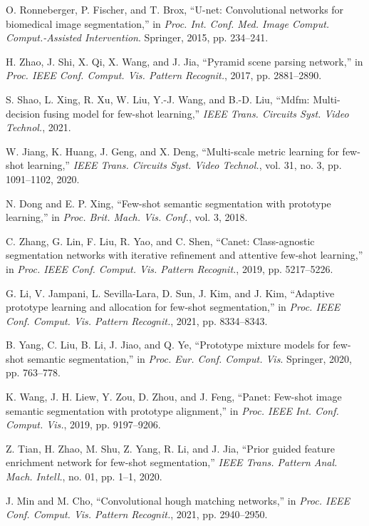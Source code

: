\documentclass[lettersize,journal]{IEEEtran}
\begin{document}
\begin{thebibliography}{10}

O. Ronneberger, P. Fischer, and T. Brox, “U-net: Convolutional networks for biomedical image segmentation,” in \textit{Proc. Int. Conf. Med. Image Comput. Comput.-Assisted Intervention}. Springer, 2015, pp. 234–241.

H. Zhao, J. Shi, X. Qi, X. Wang, and J. Jia, “Pyramid scene parsing network,” in \textit{Proc. IEEE Conf. Comput. Vis. Pattern Recognit.}, 2017, pp. 2881–2890.

S. Shao, L. Xing, R. Xu, W. Liu, Y.-J. Wang, and B.-D. Liu, “Mdfm: Multi-decision fusing model for few-shot learning,” \textit{IEEE Trans. Circuits Syst. Video Technol.}, 2021.

W. Jiang, K. Huang, J. Geng, and X. Deng, “Multi-scale metric learning for few-shot learning,” \textit{IEEE Trans. Circuits Syst. Video Technol.}, vol. 31, no. 3, pp. 1091–1102, 2020.

N. Dong and E. P. Xing, “Few-shot semantic segmentation with prototype learning,” in \textit{Proc. Brit. Mach. Vis. Conf.}, vol. 3, 2018.

C. Zhang, G. Lin, F. Liu, R. Yao, and C. Shen, “Canet: Class-agnostic segmentation networks with iterative refinement and attentive few-shot learning,” in \textit{Proc. IEEE Conf. Comput. Vis. Pattern Recognit.}, 2019, pp. 5217–5226.

G. Li, V. Jampani, L. Sevilla-Lara, D. Sun, J. Kim, and J. Kim, “Adaptive prototype learning and allocation for few-shot segmentation,” in \textit{Proc. IEEE Conf. Comput. Vis. Pattern Recognit.}, 2021, pp. 8334–8343.

B. Yang, C. Liu, B. Li, J. Jiao, and Q. Ye, “Prototype mixture models for few-shot semantic segmentation,” in \textit{Proc. Eur. Conf. Comput. Vis}. Springer, 2020, pp. 763–778.

K. Wang, J. H. Liew, Y. Zou, D. Zhou, and J. Feng, “Panet: Few-shot image semantic segmentation with prototype alignment,” in \textit{Proc. IEEE Int. Conf. Comput. Vis.}, 2019, pp. 9197–9206.

Z. Tian, H. Zhao, M. Shu, Z. Yang, R. Li, and J. Jia, “Prior guided feature enrichment network for few-shot segmentation,” \textit{IEEE Trans. Pattern Anal. Mach. Intell.}, no. 01, pp. 1–1, 2020.

J. Min and M. Cho, “Convolutional hough matching networks,” in \textit{Proc. IEEE Conf. Comput. Vis. Pattern Recognit.}, 2021, pp. 2940–2950.


\end{thebibliography}
\end{document}
